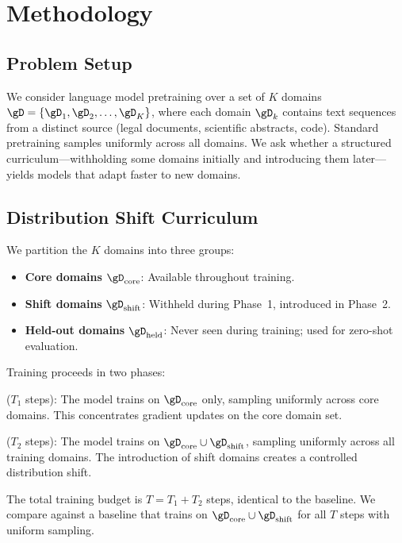 \section{Methodology}
\label{sec:method}

\subsection{Problem Setup}
\label{sec:setup}

We consider language model pretraining over a set of $K$ domains $\gD = \{\gD_1, \gD_2, \ldots, \gD_K\}$, where each domain $\gD_k$ contains text sequences from a distinct source (\eg legal documents, scientific abstracts, code). Standard pretraining samples uniformly across all domains. We ask whether a structured curriculum---withholding some domains initially and introducing them later---yields models that adapt faster to new domains.

\subsection{Distribution Shift Curriculum}
\label{sec:dsc}

We partition the $K$ domains into three groups:
\begin{itemize}[leftmargin=*,itemsep=0pt,topsep=0pt]
    \item \textbf{Core domains} $\gD_{\text{core}}$: Available throughout training.
    \item \textbf{Shift domains} $\gD_{\text{shift}}$: Withheld during Phase~1, introduced in Phase~2.
    \item \textbf{Held-out domains} $\gD_{\text{held}}$: Never seen during training; used for zero-shot evaluation.
\end{itemize}

Training proceeds in two phases:

 ($T_1$ steps): The model trains on $\gD_{\text{core}}$ only, sampling uniformly across core domains. This concentrates gradient updates on the core domain set.

 ($T_2$ steps): The model trains on $\gD_{\text{core}} \cup \gD_{\text{shift}}$, sampling uniformly across all training domains. The introduction of shift domains creates a controlled distribution shift.

The total training budget is $T = T_1 + T_2$ steps, identical to the baseline. We compare against a \uniform baseline that trains on $\gD_{\text{core}} \cup \gD_{\text{shift}}$ for all $T$ steps with uniform sampling.

